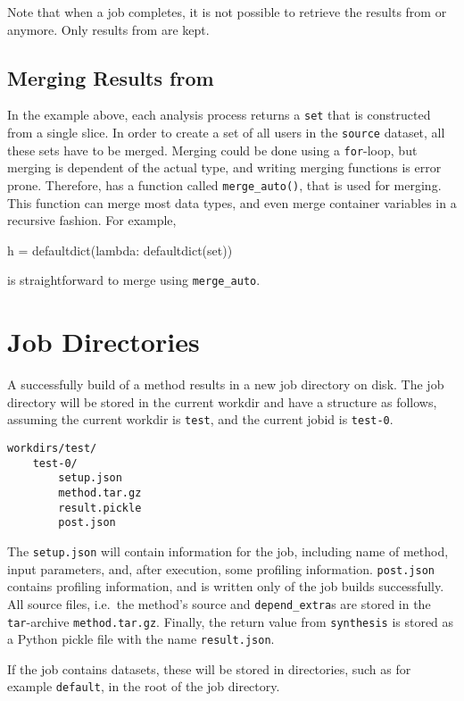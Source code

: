 Note that when a job completes, it is not possible to retrieve the
results from \prepare or \analysis anymore.  Only results from
\synthesis are kept.

\subsection{Merging Results from \analysis}
In the example above, each analysis process returns a \texttt{set}
that is constructed from a single slice.  In order to create a set of
all users in the \texttt{source} dataset, all these sets have to be
merged.  Merging could be done using a \texttt{for}-loop, but merging
is dependent of the actual type, and writing merging functions is
error prone.  Therefore, \analysisres has a function called
\texttt{merge\_auto()}, that is used for merging.  This function can
merge most data types, and even merge container variables in a
recursive fashion.  For example,
\begin{python}
h = defaultdict(lambda: defaultdict(set))
\end{python}
is straightforward to merge using \texttt{merge\_auto}.


\section{Job Directories}
A successfully build of a method results in a new job directory on
disk.  The job directory will be stored in the current workdir and
have a structure as follows, assuming the current workdir
is \texttt{test}, and the current jobid is \texttt{test-0}.
\begin{verbatim}
workdirs/test/
    test-0/
        setup.json
        method.tar.gz
        result.pickle
        post.json
\end{verbatim}
The \texttt{setup.json} will contain information for the job,
including name of method, input parameters, and, after execution, some
profiling information.  \texttt{post.json} contains profiling
information, and is written only of the job builds successfully.  All
source files, i.e.\ the method's source and \texttt{depend\_extra}s
are stored in the \texttt{tar}-archive \texttt{method.tar.gz}.
Finally, the return value from \texttt{synthesis} is stored as a
Python pickle file with the name \texttt{result.json}.

If the job contains datasets, these will be stored in directories,
such as for example \texttt{default}, in the root of the job
directory.





